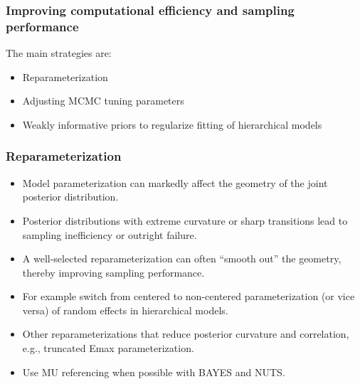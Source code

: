 \documentclass[handout]{beamer}
\begin{document}
\begin{frame}
  \frametitle{Improving computational efficiency and sampling
    performance}
  
The main strategies are:
\begin{itemize}
\item Reparameterization
\item Adjusting MCMC tuning parameters
\item Weakly informative priors to regularize fitting of hierarchical models
\end{itemize}

\end{frame}

\begin{frame}
  \frametitle{Reparameterization}

  \begin{itemize}
  \item Model parameterization can markedly affect the geometry of the
    joint posterior distribution.
\item Posterior distributions with extreme curvature or sharp
  transitions lead to sampling inefficiency or outright failure.
\item A well-selected reparameterization can often ``smooth out'' the
  geometry, thereby improving sampling performance.
\item For example switch from centered to non-centered parameterization (or vice
  versa) of random effects in hierarchical models.
\item Other reparameterizations that reduce posterior curvature and
  correlation, e.g., truncated Emax parameterization.
\item Use MU referencing when possible with BAYES and NUTS.
\end{itemize}
  
\end{frame}
\end{document}
